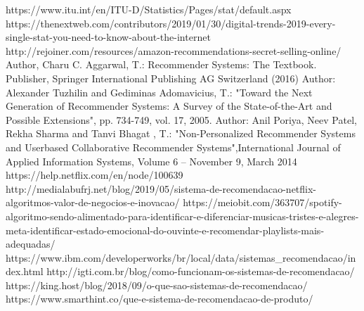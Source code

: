\documentclass[runningheads]{llncs}
\begin{document}


\newpage
\hfill









\newpage

%
%
%
% 
% 
%
\begin{thebibliography}{8}

https://www.itu.int/en/ITU-D/Statistics/Pages/stat/default.aspx
https://thenextweb.com/contributors/2019/01/30/digital-trends-2019-every-single-stat-you-need-to-know-about-the-internet
http://rejoiner.com/resources/amazon-recommendations-secret-selling-online/
Author, Charu C. Aggarwal, T.: Recommender Systems: The Textbook. Publisher, Springer International Publishing AG Switzerland (2016)
Author: Alexander Tuzhilin and Gediminas Adomavicius, T.: "Toward the Next Generation of Recommender Systems: A Survey of the State-of-the-Art and Possible Extensions", pp. 734-749, vol. 17, 2005.
Author: Anil Poriya, Neev Patel, Rekha Sharma and Tanvi Bhagat , T.: "Non-Personalized Recommender Systems and Userbased Collaborative Recommender Systems",International Journal of Applied Information Systems, Volume 6 – November 9, March 2014
 {https://help.netflix.com/en/node/100639}
 {http://medialabufrj.net/blog/2019/05/sistema-de-recomendacao-netflix-algoritmos-valor-de-negocios-e-inovacao/}
 {https://meiobit.com/363707/spotify-algoritmo-sendo-alimentado-para-identificar-e-diferenciar-musicas-tristes-e-alegres-meta-identificar-estado-emocional-do-ouvinte-e-recomendar-playlists-mais-adequadas/
}
 {https://www.ibm.com/developerworks/br/local/data/sistemas\_recomendacao/index.html}
 {http://igti.com.br/blog/como-funcionam-os-sistemas-de-recomendacao/}
 {https://king.host/blog/2018/09/o-que-sao-sistemas-de-recomendacao/}
 {https://www.smarthint.co/que-e-sistema-de-recomendacao-de-produto/}


\end{thebibliography}
\end{document}
